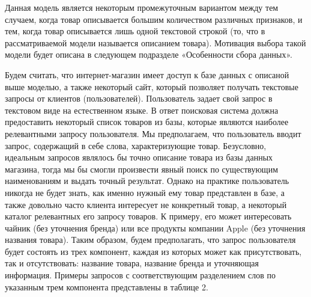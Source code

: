 \documentclass[12pt,a4paper]{article}
\begin{document}
\noindent 
Данная модель является некоторым промежуточным вариантом между тем случаем, когда товар описывается большим количеством различных признаков, и тем, когда товар описывается лишь одной текстовой строкой (то, что в рассматриваемой модели называется описанием товара). Мотивация выбора такой модели будет описана в следующем подразделе «Особенности сбора данных».\textbf{}

Будем считать, что интернет-магазин имеет доступ к базе данных с описаной выше моделью, а также некоторый сайт, который позволяет получать текстовые запросы от клиентов (пользователей). Пользователь задает свой запрос в текстовом виде на естественном языке. В ответ поисковая система должна предоставить некоторый список товаров из базы, которые являются наиболее релевантными запросу пользователя. Мы предполагаем, что пользователь вводит запрос, содержащий в себе слова, характеризующие товар. Безусловно, идеальным запросов являлось бы точно описание товара из базы данных магазина, тогда мы бы смогли произвести явный поиск по существующим наименованиям и выдать точный результат. Однако на практике пользователь никогда не будет знать, как именно нужный ему товар представлен в базе, а также довольно часто клиента интересует не конкретный товар, а некоторый каталог релевантных его запросу товаров. К примеру, его может интересовать чайник (без уточнения бренда) или все продукты компании Apple (без уточнения названия товара). Таким образом, будем предполагать, что запрос пользователя будет состоять из трех компонент, каждая из которых может как присутствовать, так и отсутствовать: название товара, название бренда и уточняющая информация. Примеры запросов с соответствующим разделением слов по указанным трем компонента представлены в таблице 2.

\begin{table}[H]
\begin{center}
    \caption{Примеры запросов и соответствующих им смысловых частей}
\end{center}
\end{table}
\end{document}
